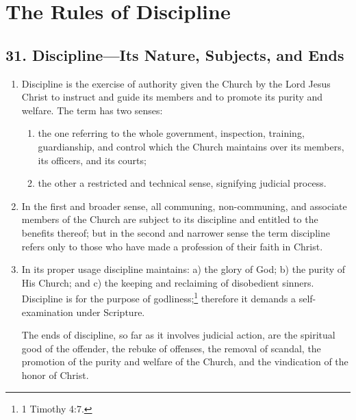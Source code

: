 \documentclass[
]{book}
\providecommand{\tightlist}{%
  \setlength{\itemsep}{0pt}\setlength{\parskip}{0pt}}
\begin{document}
\hypertarget{the-rules-of-discipline}{%
\chapter*{The Rules of Discipline}\label{the-rules-of-discipline}}

\hypertarget{disciplineits-nature-subjects-and-ends}{%
\section*{31. Discipline---Its Nature, Subjects, and Ends}\label{disciplineits-nature-subjects-and-ends}}

\protect\hypertarget{chapter-slug-31-discipline-its-nature-subjects-and-ends}{\href{}{}}

\begin{enumerate}
\def\labelenumi{\arabic{enumi}.}
\item
  \protect\hypertarget{31}{\href{}{}}Discipline is the exercise of authority given the Church by the Lord Jesus Christ to instruct and guide its members and to promote its purity and welfare. The term has two senses:

  \begin{enumerate}
  \def\labelenumii{\alph{enumii}.}
  \tightlist
  \item
    \protect\hypertarget{31.1.a}{\href{}{}}the one referring to the whole government, inspection, training, guardianship, and control which the Church maintains over its members, its officers, and its courts;
  \item
    the other a restricted and technical sense, signifying judicial process.
  \end{enumerate}
\item
  In the first and broader sense, all communing, non-communing, and associate members of the Church are subject to its discipline and entitled to the benefits thereof; but in the second and narrower sense the term discipline refers only to those who have made a profession of their faith in Christ.
\item
  In its proper usage discipline maintains: a) the glory of God; b) the purity of His Church; and c) the keeping and reclaiming of disobedient sinners. Discipline is for the purpose of godliness;\footnote{1 Timothy 4:7.} therefore it demands a self-examination under Scripture.

  The ends of discipline, so far as it involves judicial action, are the spiritual good of the offender, the rebuke of offenses, the removal of scandal, the promotion of the purity and welfare of the Church, and the vindication of the honor of Christ.
\end{enumerate}
\end{document}

